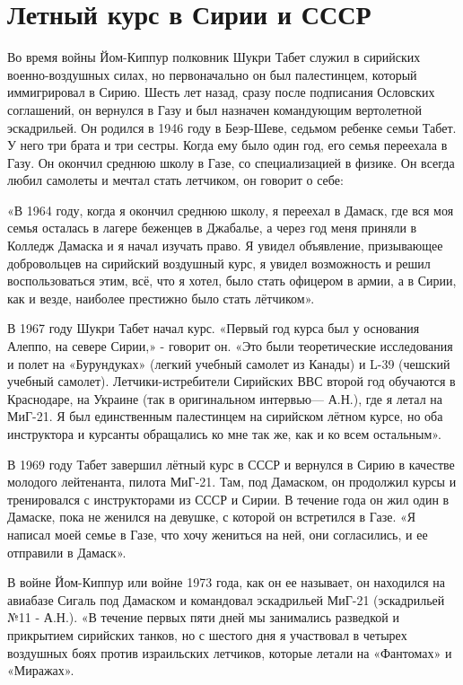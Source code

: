 \section{Летный курс в Сирии и СССР}

Во время войны Йом-Киппур полковник Шукри Табет служил в сирийских военно-воздушных силах, но первоначально он был палестинцем, который иммигрировал в Сирию. Шесть лет назад, сразу после подписания Ословских соглашений, он вернулся в Газу и был назначен командующим вертолетной эскадрильей. Он родился в 1946 году в Беэр-Шеве, седьмом ребенке семьи Табет. У него три брата и три сестры. Когда ему было один год, его семья переехала в Газу. Он окончил среднюю школу в Газе, со специализацией в физике. Он всегда любил самолеты и мечтал стать летчиком, он говорит о себе:

«В 1964 году, когда я окончил среднюю школу, я переехал в Дамаск, где вся моя семья осталась в лагере беженцев в Джабалье, а через год меня приняли в Колледж Дамаска и я начал изучать право. Я увидел объявление, призывающее добровольцев на сирийский воздушный курс, я увидел возможность и решил воспользоваться этим, всё, что я хотел, было стать офицером в армии, а в Сирии, как и везде, наиболее престижно было стать лётчиком».

В 1967 году Шукри Табет начал курс. «Первый год курса был у основания Алеппо, на севере Сирии,» - говорит он. «Это были теоретические исследования и полет на «Бурундуках» (легкий учебный самолет из Канады) и L-39 (чешский учебный самолет). Летчики-истребители Сирийских ВВС второй год обучаются в Краснодаре, на Украине (так в оригинальном интервью— А.Н.), где я летал на МиГ-21. Я был единственным палестинцем на сирийском лётном курсе, но оба инструктора и курсанты обращались ко мне так же, как и ко всем остальным».

В 1969 году Табет завершил лётный курс в СССР и вернулся в Сирию в качестве молодого лейтенанта, пилота МиГ-21. Там, под Дамаском, он продолжил курсы и тренировался с инструкторами из СССР и Сирии. В течение года он жил один в Дамаске, пока не женился на девушке, с которой он встретился в Газе. «Я написал моей семье в Газе, что хочу жениться на ней, они согласились, и ее отправили в Дамаск».

В войне Йом-Киппур или войне 1973 года, как он ее называет, он находился на авиабазе Сигаль под Дамаском и командовал эскадрильей МиГ-21 (эскадрильей №11 - А.Н.). «В течение первых пяти дней мы занимались разведкой и прикрытием сирийских танков, но с шестого дня я участвовал в четырех воздушных боях против израильских летчиков, которые летали на «Фантомах» и «Миражах». 

